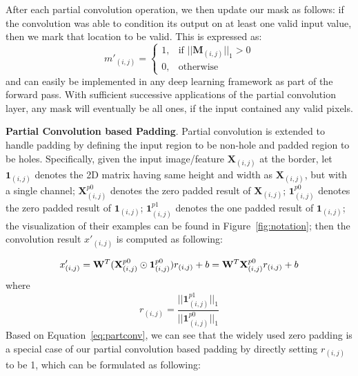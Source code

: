 \documentclass[10pt,twocolumn,letterpaper]{article}
\begin{document}
After each partial convolution operation, we then update our mask as follows: if the convolution was able to condition its output on at least one valid input value, then we mark that location to be valid. This is expressed as:
\begin{equation}
m'_{(i,j)}=\begin{cases}
    1, & \text{if } ||\mathbf{M}_{(i,j)}||_{1}>0  \\
    0, & \text{otherwise}
\end{cases}
\label{eq:mask_update}
\end{equation}
and can easily be implemented in any deep learning framework as part of the forward pass. With sufficient successive applications of the partial convolution layer, any mask will eventually be all ones, if the input contained any valid pixels. 

\textbf{Partial Convolution based Padding}.
Partial convolution is extended to handle padding by defining the input region to be non-hole and padded region to be holes. Specifically,
given the input image/feature $\mathbf{X}_{(i,j)}$ at the border, let $\mathbf{1}_{(i,j)}$ denotes the 2D matrix having same height and width as $\mathbf{X}_{(i,j)}$, but with a single channel; $\mathbf{X}^{p0}_{(i,j)}$ denotes the zero padded result of $\mathbf{X}_{(i,j)}$; $\mathbf{1}^{p0}_{(i,j)}$ denotes the zero padded result of $\mathbf{1}_{(i,j)}$; $\mathbf{1}^{p1}_{(i,j)}$ denotes the one padded result of $\mathbf{1}_{(i,j)}$; the visualization of their examples can be found in Figure~\ref{fig:notation}; then the convolution result $x'_{(i,j)}$ is computed as following:

\begin{equation}
\label{eq:partconv}
    x'_{(i,j)} = \mathbf{W}^T(\mathbf{X}^{p0}_{(i,j)}\odot\mathbf{1}^{p0}_{(i,j)})r_{(i,j)} + b = \\ \mathbf{W}^T\mathbf{X}^{p0}_{(i,j)}r_{(i,j)} + b
\end{equation}
where
\begin{equation}
    r_{(i,j)} = \frac{||\mathbf{1}^{p1}_{(i,j)}||_1}{||\mathbf{1}^{p0}_{(i,j)}||_1}
\end{equation}%
Based on Equation~\ref{eq:partconv}, we can see that the widely used zero padding is a special case of our partial convolution based padding by directly setting $r_{(i,j)}$ to be 1, which can be formulated as following:
\end{document}
